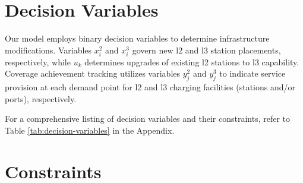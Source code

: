 \section{Decision Variables}



Our model employs binary decision variables to determine infrastructure modifications. Variables $x^2_i$ and $x^3_i$ govern new \gls{l2} and \gls{l3} station placements, respectively, while $u_k$ determines upgrades of existing \gls{l2} stations to \gls{l3} capability. Coverage achievement tracking utilizes variables $y^2_j$ and $y^3_j$ to indicate service provision at each demand point for \gls{l2} and \gls{l3} charging facilities (stations and/or ports), respectively. 

For a comprehensive listing of decision variables and their constraints, refer to Table \ref{tab:decision-variables} in the Appendix.

\section{Constraints}







